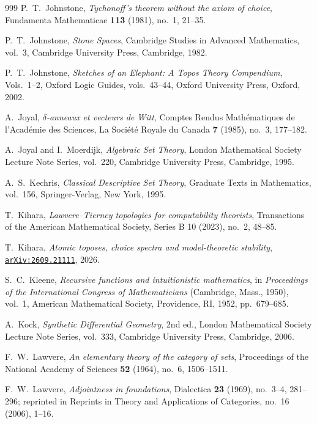 \begin{thebibliography}{999}
P.~T.~Johnstone,
\emph{Tychonoff's theorem without the axiom of choice},
Fundamenta Mathematicae \textbf{113} (1981), no.~1, 21--35.

P.~T.~Johnstone,
\emph{Stone Spaces},
Cambridge Studies in Advanced Mathematics, vol.~3, Cambridge University Press, Cambridge, 1982.

P.~T.~Johnstone,
\emph{Sketches of an Elephant: A Topos Theory Compendium},
Vols.~1--2, Oxford Logic Guides, vols.~43--44, Oxford University Press, Oxford, 2002.

A.~Joyal,
\emph{$\delta$-anneaux et vecteurs de Witt},
Comptes Rendus Math\'ematiques de l'Acad\'emie des Sciences, La Soci\'et\'e Royale du Canada \textbf{7} (1985), no.~3, 177--182.

A.~Joyal and I.~Moerdijk,
\emph{Algebraic Set Theory},
London Mathematical Society Lecture Note Series, vol.~220, Cambridge University Press, Cambridge, 1995.

A.~S.~Kechris,
\emph{Classical Descriptive Set Theory},
Graduate Texts in Mathematics, vol.~156, Springer-Verlag, New York, 1995.

T.~Kihara,
\emph{Lawvere--Tierney topologies for computability theorists},
Transactions of the American Mathematical Society, Series B 10 (2023), no.~2, 48--85.

T.~Kihara,
\emph{Atomic toposes, choice spectra and model-theoretic stability},
\href{https://arxiv.org/abs/2609.21111}{\texttt{arXiv:2609.21111}}, 2026.

S.~C.~Kleene,
\emph{Recursive functions and intuitionistic mathematics},
in \emph{Proceedings of the International Congress of Mathematicians} (Cambridge, Mass., 1950), vol.~1, American Mathematical Society, Providence, RI, 1952, pp.~679--685.

A.~Kock,
\emph{Synthetic Differential Geometry},
2nd ed., London Mathematical Society Lecture Note Series, vol.~333, Cambridge University Press, Cambridge, 2006.

F.~W.~Lawvere,
\emph{An elementary theory of the category of sets},
Proceedings of the National Academy of Sciences \textbf{52} (1964), no.~6, 1506--1511.

F.~W.~Lawvere,
\emph{Adjointness in foundations},
Dialectica \textbf{23} (1969), no.~3--4, 281--296; reprinted in Reprints in Theory and Applications of Categories, no.~16 (2006), 1--16.


\end{thebibliography}

